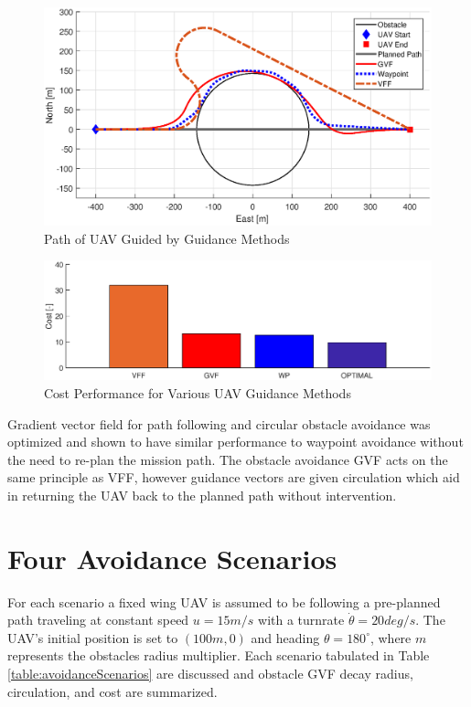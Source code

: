 \documentclass[numbered,pdftex]{ohio-etd}
\begin{document}
\begin{figure}[H]
	\centering
	\includegraphics[trim=0 50 0 65,clip,width=15cm]{Figures/Simulations/compareMethods}
	\caption{Path of UAV Guided by Guidance Methods}
	\label{fig:comparemethods}
\end{figure}


\begin{figure}[H]
	\centering
	\label{fig:barPlotCost}
	\includegraphics[width=15cm]{Figures/Simulations/barPlotPerformance}
	\caption{Cost Performance for Various UAV Guidance Methods}
	\label{fig:barplotperformance}
\end{figure}

Gradient vector field for path following and circular obstacle avoidance was optimized and shown to have similar performance to waypoint avoidance without the need to re-plan the mission path. The obstacle avoidance GVF acts on the same principle as VFF, however guidance vectors are given circulation which aid in returning the UAV back to the planned path without intervention. 


\section{Four Avoidance Scenarios}
For each scenario a fixed wing UAV is assumed to be following a pre-planned path traveling at constant speed $u=15m/s$ with a turnrate $\dot{\theta}=20 deg/s$. The UAV's initial position is set to $(100m,0)$ and heading $\theta = 180^\circ$, where $m$ represents the obstacles radius multiplier. Each scenario tabulated in Table \ref{table:avoidanceScenarios} are discussed and obstacle GVF decay radius, circulation, and cost are summarized.\\
\end{document}
